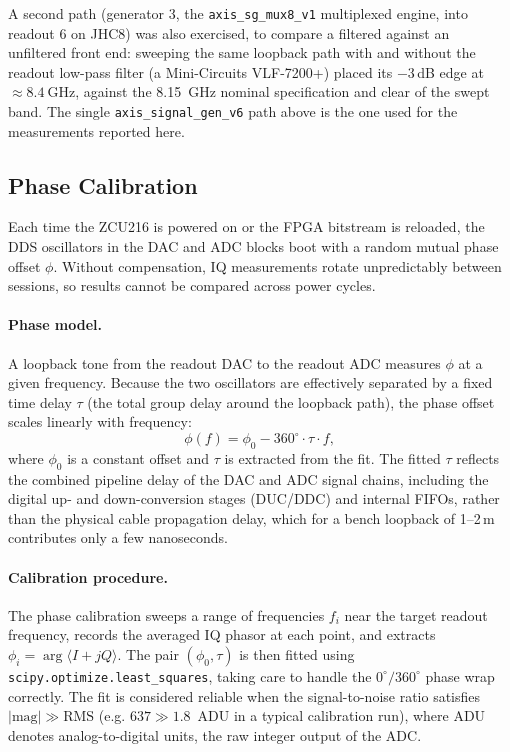 A second path (generator 3, the \texttt{axis\_sg\_mux8\_v1} multiplexed engine, into
readout 6 on JHC8) was also exercised, to compare a filtered against an unfiltered
front end: sweeping the same loopback path with and without the readout low-pass
filter (a Mini-Circuits VLF-7200+) placed its $-3$\,dB edge at
${\approx}\SI{8.4}{\giga\hertz}$, against the \SI{8.15}{\giga\hertz} nominal
specification and clear of the swept band.
The single \texttt{axis\_signal\_gen\_v6} path above is the one used for
the measurements reported here.

\subsection{Phase Calibration}
\label{subsec:phase_calib}

Each time the ZCU216 is powered on or the FPGA bitstream is reloaded, the DDS
oscillators in the DAC and ADC blocks boot with a random mutual phase offset
$\phi$.  Without compensation, IQ measurements rotate unpredictably between
sessions, so results cannot be compared across power cycles.

\paragraph{Phase model.}
A loopback tone from the readout DAC to the readout ADC measures $\phi$ at a given
frequency.  Because the two oscillators are effectively separated by a fixed time
delay $\tau$ (the total group delay around the loopback path), the phase
offset scales linearly with frequency:
\begin{equation}
  \phi(f) = \phi_0 - 360^\circ \cdot \tau \cdot f,
\label{eq:phase_model}
\end{equation}
where $\phi_0$ is a constant offset and $\tau$ is extracted from the fit.
The fitted $\tau$ reflects the combined pipeline delay of the DAC and ADC signal
chains, including the digital up- and down-conversion stages (DUC/DDC) and internal
FIFOs, rather than the physical cable propagation delay, which for a bench loopback
of 1--2\,m contributes only a few nanoseconds.

\paragraph{Calibration procedure.}
The phase calibration sweeps a range of frequencies $f_i$ near the target readout
frequency, records the averaged IQ phasor at each point, and extracts
$\phi_i = \arg\langle I + jQ \rangle$.  The pair $(\phi_0, \tau)$ is then fitted
using \texttt{scipy.optimize.least\_squares}, taking care to handle the
$0^\circ/360^\circ$ phase wrap correctly.  The fit is considered reliable when
the signal-to-noise ratio satisfies $|\text{mag}| \gg \text{RMS}$ (e.g.
$637 \gg 1.8$~ADU in a typical calibration run), where ADU denotes analog-to-digital
units, the raw integer output of the ADC.

